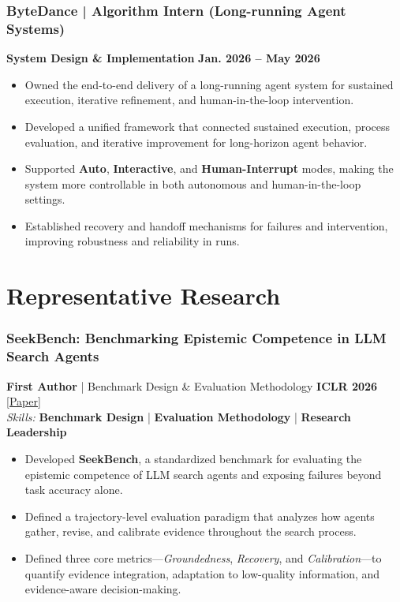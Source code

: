 \documentclass[10pt,a4paper]{article}
\begin{document}
\subsubsection*{\color{itemcolor}ByteDance | Algorithm Intern (Long-running Agent Systems)}
\noindent\textbf{\color{sectioncolor}System Design \& Implementation} \hfill \color{accentcolor}\textbf{Jan. 2026 -- May 2026}
\begin{itemize}[leftmargin=*]
    \item Owned the end-to-end delivery of a long-running agent system for sustained execution, iterative refinement, and human-in-the-loop intervention.
    \item Developed a unified framework that connected sustained execution, process evaluation, and iterative improvement for long-horizon agent behavior.
    \item Supported \textbf{Auto}, \textbf{Interactive}, and \textbf{Human-Interrupt} modes, making the system more controllable in both autonomous and human-in-the-loop settings.
    \item Established recovery and handoff mechanisms for failures and intervention, improving robustness and reliability in runs.
\end{itemize}

\section*{\color{sectioncolor}Representative Research}

\subsubsection*{\color{itemcolor}SeekBench: Benchmarking Epistemic Competence in LLM Search Agents}
\noindent\textbf{\color{sectioncolor}First Author} | Benchmark Design \& Evaluation Methodology \hfill \color{accentcolor}\textbf{ICLR 2026} \\
\noindent\href{https://arxiv.org/abs/2509.22391}{\color{linkcolor}[Paper]} \\
\noindent\textit{\color{graytext}Skills:} \textbf{Benchmark Design} | \textbf{Evaluation Methodology} | \textbf{Research Leadership}
\begin{itemize}[leftmargin=*]
    \item Developed \textbf{SeekBench}, a standardized benchmark for evaluating the epistemic competence of LLM search agents and exposing failures beyond task accuracy alone.
    \item Defined a trajectory-level evaluation paradigm that analyzes how agents gather, revise, and calibrate evidence throughout the search process.
    \item Defined three core metrics---\textit{Groundedness}, \textit{Recovery}, and \textit{Calibration}---to quantify evidence integration, adaptation to low-quality information, and evidence-aware decision-making.
\end{itemize}
\vspace{0.3em}
\end{document}
